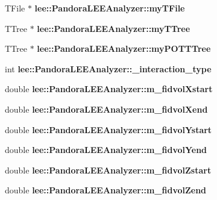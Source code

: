 \begin{DoxyCompactItemize}
\item 
\hypertarget{group__lee_ga8a86ec4686558f03c8a2be30a6bbcc2a}{T\-File $\ast$ {\bfseries lee\-::\-Pandora\-L\-E\-E\-Analyzer\-::my\-T\-File}}\label{group__lee_ga8a86ec4686558f03c8a2be30a6bbcc2a}

\item 
\hypertarget{group__lee_ga20daae4b8c56ed5c2c2fd6b7b2a490dc}{T\-Tree $\ast$ {\bfseries lee\-::\-Pandora\-L\-E\-E\-Analyzer\-::my\-T\-Tree}}\label{group__lee_ga20daae4b8c56ed5c2c2fd6b7b2a490dc}

\item 
\hypertarget{group__lee_ga3c10053a4ef8cb336589fb86a5b6f587}{T\-Tree $\ast$ {\bfseries lee\-::\-Pandora\-L\-E\-E\-Analyzer\-::my\-P\-O\-T\-T\-Tree}}\label{group__lee_ga3c10053a4ef8cb336589fb86a5b6f587}

\item 
\hypertarget{group__lee_gafd61fa715317d7a54f36339589736b1e}{int {\bfseries lee\-::\-Pandora\-L\-E\-E\-Analyzer\-::\-\_\-interaction\-\_\-type}}\label{group__lee_gafd61fa715317d7a54f36339589736b1e}

\item 
\hypertarget{group__lee_ga56d3f395f76ae35174ea4714598debb2}{double {\bfseries lee\-::\-Pandora\-L\-E\-E\-Analyzer\-::m\-\_\-fidvol\-Xstart}}\label{group__lee_ga56d3f395f76ae35174ea4714598debb2}

\item 
\hypertarget{group__lee_gac263324598456c587395ce39f9a86b4a}{double {\bfseries lee\-::\-Pandora\-L\-E\-E\-Analyzer\-::m\-\_\-fidvol\-Xend}}\label{group__lee_gac263324598456c587395ce39f9a86b4a}

\item 
\hypertarget{group__lee_ga678aca01684db5a8a9abcb6903a7eee5}{double {\bfseries lee\-::\-Pandora\-L\-E\-E\-Analyzer\-::m\-\_\-fidvol\-Ystart}}\label{group__lee_ga678aca01684db5a8a9abcb6903a7eee5}

\item 
\hypertarget{group__lee_gad8b5a3fbf63831101e06bf3f7c831a03}{double {\bfseries lee\-::\-Pandora\-L\-E\-E\-Analyzer\-::m\-\_\-fidvol\-Yend}}\label{group__lee_gad8b5a3fbf63831101e06bf3f7c831a03}

\item 
\hypertarget{group__lee_ga2ecd11cab7811730100be8a133cb686f}{double {\bfseries lee\-::\-Pandora\-L\-E\-E\-Analyzer\-::m\-\_\-fidvol\-Zstart}}\label{group__lee_ga2ecd11cab7811730100be8a133cb686f}

\item 
\hypertarget{group__lee_gab2b230f2c1c2991564e8078fa7ce52e9}{double {\bfseries lee\-::\-Pandora\-L\-E\-E\-Analyzer\-::m\-\_\-fidvol\-Zend}}\label{group__lee_gab2b230f2c1c2991564e8078fa7ce52e9}


\end{DoxyCompactItemize}
